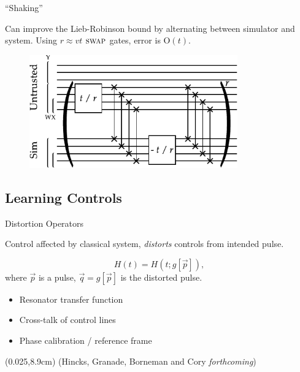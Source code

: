 \documentclass[xcolor=dvipsnames, compress]{beamer}
\newcommand{\OO}{\mathrm{O}}
\newcommand{\swapgt}{\textsc{swap}}
\newcommand{\bottomnote}[1]{
  \begin{textblock*}{0.95\paperwidth} (0.025\paperwidth,8.9cm)
    {\tiny \hfill #1}
  \end{textblock*}
}
\begin{document}
\begin{frame}{``Shaking''}

  Can improve the Lieb-Robinson bound by alternating between simulator
  and system. Using $r \approx vt$ $\swapgt$ gates, error is $\OO(t)$.

  \begin{figure}
    \centering
    \includegraphics[width=0.8\textwidth]{figures/shaking}
  \end{figure}

\end{frame}

\subsection[Control]{Learning Controls}

\begin{frame}{Distortion Operators}

  Control affected by classical system, \emph{distorts}
  controls from intended pulse.

  \[
    H(t) = H(t; g[\vec{p}]),
  \]
  where $\vec{p}$ is a pulse, $\vec{q} = g[\vec{p}]$ is 
  the distorted pulse.

  \pause

  \begin{itemize}[<+->]
      \item Resonator transfer function
      \item Cross-talk of control lines
      \item Phase calibration / reference frame
  \end{itemize}

  \bottomnote{(Hincks, Granade, Borneman and Cory \emph{forthcoming})}

\end{frame}
\end{document}
